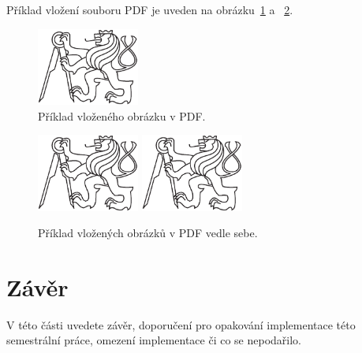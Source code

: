 \documentclass[report,11pt]{elsarticle}
\begin{document}
Příklad vložení souboru PDF je uveden na obrázku~\ref{fig:fig1} a ~\ref{fig:fig2}.

\begin{figure}[!ht]
\begin{center}
  \includegraphics[width=0.3\textwidth]{cvut-logo-bw}
\caption{{\label{fig:fig1}}Příklad vloženého obrázku v PDF.}
\end{center}
\end{figure}

\begin{figure}[!ht]
\begin{center}
  \includegraphics[width=0.3\textwidth]{cvut-logo-bw}
  \includegraphics[width=0.3\textwidth]{cvut-logo-bw}
\caption{{\label{fig:fig2}}Příklad vložených obrázků v PDF vedle sebe.}
\end{center}
\end{figure}

\section{\label{SEC:Conclusion}Závěr}

V této části uvedete závěr, doporučení pro opakování implementace této
semestrální práce, omezení implementace či co se nepodařilo.
\end{document}
